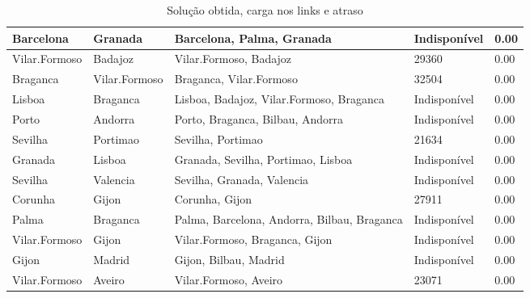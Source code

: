 \begin{table}[!htb]
{\begin{tabular}{|l|l|l|l|l|}
Barcelona & Granada & Barcelona, Palma, Granada & Indisponível & 0.00 \\ \hline
Vilar.Formoso & Badajoz & Vilar.Formoso, Badajoz & 29360 & 0.00 \\ \hline
Braganca & Vilar.Formoso & Braganca, Vilar.Formoso & 32504 & 0.00 \\ \hline
Lisboa & Braganca & Lisboa, Badajoz, Vilar.Formoso, Braganca & Indisponível & 0.00 \\ \hline
Porto & Andorra & Porto, Braganca, Bilbau, Andorra & Indisponível & 0.00 \\ \hline
Sevilha & Portimao & Sevilha, Portimao & 21634 & 0.00 \\ \hline
Granada & Lisboa & Granada, Sevilha, Portimao, Lisboa & Indisponível & 0.00 \\ \hline
Sevilha & Valencia & Sevilha, Granada, Valencia & Indisponível & 0.00 \\ \hline
Corunha & Gijon & Corunha, Gijon & 27911 & 0.00 \\ \hline
Palma & Braganca & Palma, Barcelona, Andorra, Bilbau, Braganca & Indisponível & 0.00 \\ \hline
Vilar.Formoso & Gijon & Vilar.Formoso, Braganca, Gijon & Indisponível & 0.00 \\ \hline
Gijon & Madrid & Gijon, Bilbau, Madrid & Indisponível & 0.00 \\ \hline
Vilar.Formoso & Aveiro & Vilar.Formoso, Aveiro & 23071 & 0.00 \\ \hline
\end{tabular}}
\caption[]{Solução obtida, carga nos links e atraso}
\end{table}

\begin{table}[!htb]
        \centering
\caption[]{Solução obtida, carga nos links e atraso}
\end{table}

